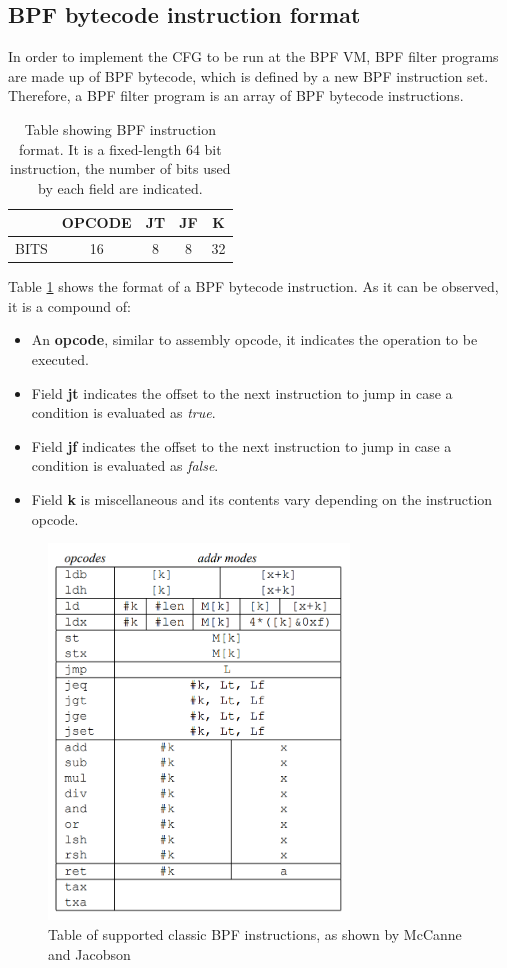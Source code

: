 \documentclass[12pt]{report} %
\begin{document}
\subsection{BPF bytecode instruction format}
In order to implement the CFG to be run at the BPF VM, BPF filter programs are made up of BPF bytecode, which is defined by a new BPF instruction set. Therefore, a BPF filter program is an array of BPF bytecode instructions\cite{bpf_organicprogrammer_analysis}.


\begin{table}[H]
\begin{tabular}{|c|c|c|c|c|}
\hline
& OPCODE & JT & JF & K\\
\hline
BITS & 16 & 8 & 8 & 32\\
\hline
\end{tabular}
\caption{Table showing BPF instruction format. It is a fixed-length 64 bit instruction, the number of bits used by each field are indicated.}
\label{table:bpf_inst_format}
\end{table}

Table \ref{table:bpf_inst_format} shows the format of a BPF bytecode instruction. As it can be observed, it is a compound of:
\begin{itemize}
\item An \textbf{opcode}, similar to assembly opcode, it indicates the operation to be executed.
\item Field \textbf{jt} indicates the offset to the next instruction to jump in case a condition is evaluated as \textit{true}.
\item Field \textbf{jf} indicates the offset to the next instruction to jump in case a condition is evaluated as \textit{false}.
\item Field \textbf{k} is miscellaneous and its contents vary depending on the instruction opcode.
\end{itemize}

\begin{figure}[H]
	\centering
	\includegraphics[width=8cm]{bpf_instructions.png}
	\caption{Table of supported classic BPF instructions, as shown by McCanne and Jacobson\cite{bpf_bsd_origin_bpf_page7}}
	\label{fig:bpf_instructions}
\end{figure}
\end{document}
